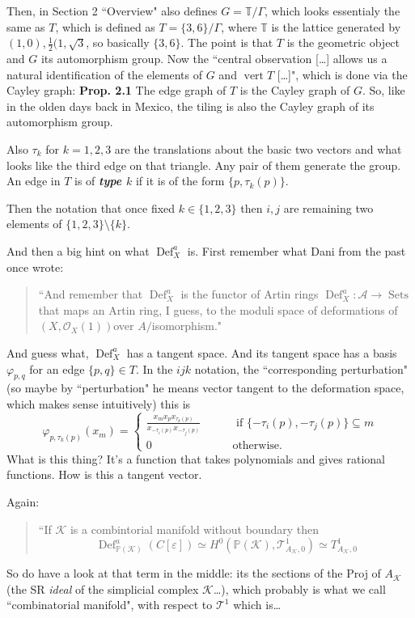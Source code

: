 Then, in Section 2 ``Overview" \cite{jan1} also defines \(G=\mathbb{T}/\Gamma\), which looks essentialy the same as \(T\), which is defined as \(T=\{3,6\}/\Gamma\), where \(\mathbb{T}\) is the lattice generated by \((1,0), \frac{1}{2}(1,\sqrt{3} \), so basically \(\{3,6\}\). The point is that \(T\) is the geometric object and \(G\) its automorphism group. Now the ``central observation […] allows us a natural identification of the elements of \(G\) and \(\operatorname{v ert}T\) […]", which is done via the Cayley graph: \textbf{Prop. 2.1} The edge graph of \(T\) is the Cayley graph of  \(G\). So, like in the olden days back in Mexico, the tiling is also the Cayley graph of its automorphism group.

Also \(\tau_k\) for \(k=1,2,3\) are the translations about the basic two vectors and what looks like the third edge on that triangle. Any pair of them generate the group. An edge in \(T\) is of \textit{\textbf{type \(k\)}} if it is of the form \(\{p,\tau_k(p)\}\).

Then the notation that once fixed \(k \in \{1,2,3\}\) then \(i,j\) are remaining two elements of \(\{1,2,3\}\setminus \{k\}\).

And then a big hint on what \(\operatorname{Def}_{X}^a\) is. First remember what Dani from the past once wrote:
\begin{quotation}
	``And remember that $\operatorname{Def}^a_{X}$ is the functor of Artin rings $\operatorname{Def}^a_{X}:\mathcal{A}\longrightarrow \operatorname{Sets}$ that maps an Artin ring, I guess, to the moduli space of deformations of $(X,\mathcal{O}_X(1))$over $A \Big/$isomorphism."
\end{quotation}
And guess what, \(\operatorname{Def}_{X}^a\) has a tangent space. And its tangent space has a basis \(\varphi_{p,q}\) for an edge \(\{p,q\}\in T\). In the \(ijk\) notation, the ``corresponding perturbation" ({\color{6}so maybe by ``perturbation" he means vector tangent to the deformation space, which makes sense intuitively}) this is
\[\varphi_{p,\tau_k(p)}(x_m)=\begin{cases}
\frac{x_m x_p x_{\tau_k(p)}}{x_{-\tau_i(p)}x_{-\tau_j(p)}}\qquad &\text{ if \(\{-\tau_i(p),-\tau_j(p)\} \subseteq m\)}  \\
	0\qquad &\text{otherwise.} 
\end{cases}\]
What is this thing? It's a function that takes polynomials and gives rational functions. How is this a tangent vector.

Again:

\begin{quotation}
	``If \(\mathcal{K}\) is a combintorial manifold without boundary then
	\[\operatorname{Def}_{\mathbb{P}(\mathcal{K})}^a(C[\varepsilon])\simeq H^{0}(\mathbb{P}(\mathcal{K}),\mathcal{T}^1_{A_{\mathcal{K}},0})\simeq T^1_{A_{\mathcal{K}},0}\]
\end{quotation}
So do have a look at that term in the middle: its the sections of the Proj of \(A_\mathcal{K}\) (the SR \textit{ideal} of the simplicial complex \(\mathcal{K}\)…), which probably is what we call ``combinatorial manifold", with respect to \(\mathcal{T}^1\) which is…

